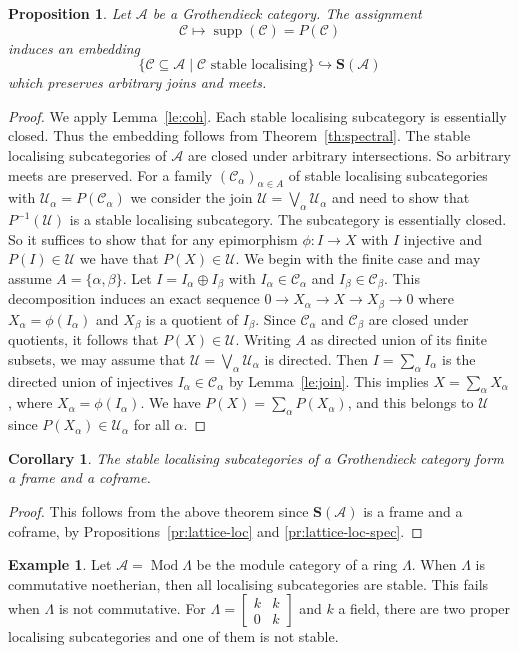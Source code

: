 \documentclass[a4paper]{amsart}
\theoremstyle{plain}
\newtheorem{prop}[thm]{Proposition}
\newtheorem{cor}[thm]{Corollary}
\theoremstyle{definition}
\newtheorem{exm}[thm]{Example}
\theoremstyle{remark}
\numberwithin{equation}{section}
\newcommand{\Mod}{\operatorname{Mod}}
\newcommand{\supp}{\operatorname{supp}}
\newcommand{\smatrix}[1]{\left[\begin{smallmatrix}#1\end{smallmatrix}\right]}
\def\A{\mathcal A}
\def\C{\mathcal C}
\def\U{\mathcal U}
\def\bfS{\mathbf S}
\def\a{\alpha}
\def\b{\beta}
\def\p{\phi}
\def\La{\Lambda}
\begin{document}
\begin{prop}\label{pr:stable-loc}
  Let $\A$ be a Grothendieck category. The assignment
  \[\C\longmapsto\supp(\C)=P(\C)\] induces an embedding 
\[\{\C\subseteq\A\mid \C\text{  stable
    localising}\}\hookrightarrow\bfS(\A)\]
which preserves  arbitrary joins and meets. 
\end{prop}
\begin{proof}
  We apply Lemma~\ref{le:coh}.  Each stable localising subcategory is
  essentially closed. Thus the embedding follows from Theorem~\ref{th:spectral}.
  The stable localising subcategories of $\A$ are closed under
  arbitrary intersections. So arbitrary meets are preserved. For a
  family $(\C_\a)_{\a\in A}$ of stable localising subcategories with
  $\U_\a=P(\C_\a)$ we consider the join $\U=\bigvee_\a \U_\a$ and need to show
  that $P^{-1}(\U)$ is a stable localising subcategory. The
  subcategory is essentially closed. So it suffices to show that for any
  epimorphism $\p\colon I\to X$ with $I$ injective and $P(I)\in \U$ we
  have that $P(X)\in \U$. We begin with the finite case and may assume
  $A= \{\a,\b\}$. Let $I=I_\a\oplus I_\b$ with $I_\a\in\C_\a$ and
  $I_\b\in\C_\b$. This decomposition induces an exact sequence
  $0\to X_\a\to X\to X_\b\to 0$ where $X_\a=\p(I_\a)$ and $X_\b$ is a
  quotient of $I_\b$. Since $\C_\a$ and $\C_\b$ are closed under
  quotients, it follows that $P(X)\in \U$. Writing $A$ as directed
  union of its finite subsets, we may assume that
  $\U=\bigvee_\a \U_\a$ is directed. Then $I=\sum_\a I_\a$ is the
  directed union of injectives $I_\a\in\C_\a$ by
  Lemma~\ref{le:join}. This implies $X=\sum_\a X_\a$, where
  $X_\a=\p(I_\a)$. We have $P(X)=\sum_\a P(X_\a)$, and this belongs to
  $\U$ since $P(X_\a)\in\U_\a$ for all $\a$.
\end{proof}

\begin{cor}
The stable localising subcategories of a Grothendieck category form a
frame and a coframe.
\end{cor}
\begin{proof}
  This follows from the above theorem since $\bfS(\A)$ is a frame and
  a coframe, by Propositions~\ref{pr:lattice-loc} and
  \ref{pr:lattice-loc-spec}.
\end{proof}


\begin{exm}
Let $\A=\Mod\La$ be the module category of a ring $\La$. When $\La$ is
commutative noetherian, then all localising subcategories are
stable. This fails when $\La$ is not commutative. For
$\La=\smatrix{k&k\\0&k}$ and $k$ a field, there are two proper
localising subcategories and one of them is not stable.
\end{exm}
\end{document}
